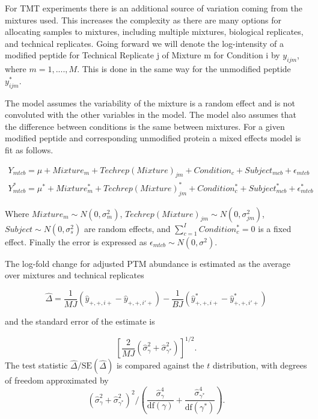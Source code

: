 \documentclass{mcp}
\begin{document}
For TMT experiments there is an additional source of variation coming from the mixtures used. This increases the complexity as there are many options for allocating samples to mixtures, including multiple mixtures, biological replicates, and technical replicates. Going forward we will denote the log-intensity of a modified peptide for Technical Replicate j of Mixture m for Condition i by $y_{ijm}$, where $m = 1,....,M$. This is done in the same way for the unmodified peptide $y^*_{ijm}$.

The model assumes the variability of the mixture is a random effect and is not convoluted with the other variables in the model. The model also assumes that the difference between conditions is the same between mixtures. For a given modified peptide and corresponding unmodified protein a mixed effects model is fit as follows.

\begin{align*}
Y_{mtcb} = \mu + Mixture_m + Techrep(Mixture)_{jm} + Condition_c + Subject_{mcb} + \epsilon_{mtcb}\\
Y^*_{mtcb} = \mu^* + Mixture^*_m + Techrep(Mixture)^*_{jm} + Condition^*_c + Subject^*_{mcb} + \epsilon^*_{mtcb}
\end{align*}

Where $Mixture_m \sim N(0, \sigma^2_m)$, $Techrep(Mixture)_{jm} \sim N(0, \sigma^2_{jm})$, $Subject \sim N(0, \sigma^2_{s})$ are random effects, and $\sum_{c=1}^{I} Condition_{c}^{\ast} = 0$ is a fixed effect. Finally the error is expressed as $\epsilon_{mtcb} \sim N(0, \sigma^2)$.


The log-fold change for adjusted PTM abundance is estimated as the average over mixtures and technical replicates

$$\hat{\Delta} = \frac{1}{MJ} \left( \hat{y}_{+,+,i+} - \hat{y}_{+,+,i'+} \right) - \frac{1}{BJ} \left( \hat{y}_{+,+,i+}^{\ast} - \hat{y}_{+,+,i'+}^{\ast} \right)$$

and the standard error of the estimate is 

\[
\left[ \frac{2}{MJ} \left( \hat{\sigma}_{\gamma}^{2} + \hat{\sigma}_{\gamma^{\ast}}^{2} \right) \right] ^{1/2}.
\]
The test statistic $\hat{\Delta} / \mathrm{SE}(\hat{\Delta})$ is compared against the $t$ distribution, with degrees of freedom approximated by
\[
\left( \hat{\sigma}_{\gamma}^{2} + \hat{\sigma}_{\gamma^{\ast}}^{2} \right)^2 \bigg/
\left( \frac{\hat{\sigma}_{\gamma}^{4}}{  \mathrm{df}(\gamma)} + \frac{\hat{\sigma}_{\gamma^{\ast}}^{4}}{\mathrm{df}(\gamma^{\ast})} \right).
\]
\end{document}
